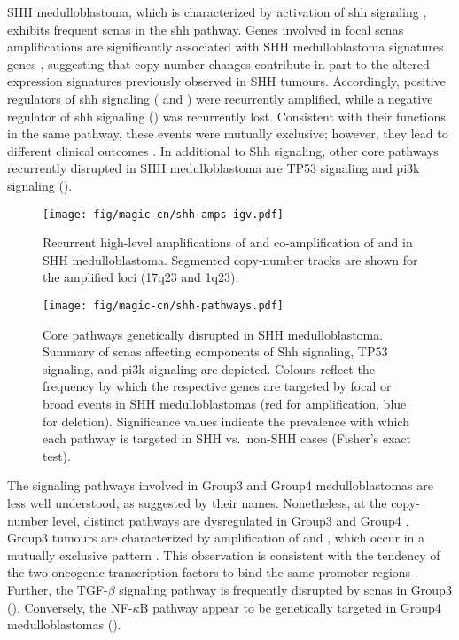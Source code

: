 \clearpage

SHH medulloblastoma, which is characterized by activation of \gls{shh} signaling , exhibits frequent \gls{scnas} in the \gls{shh} pathway. Genes involved in focal \gls{scnas} amplifications are significantly associated with SHH medulloblastoma signatures genes , suggesting that copy-number changes contribute in part to the altered expression signatures previously observed in SHH tumours. Accordingly, positive regulators of \gls{shh} signaling ( and ) were recurrently amplified, while a negative regulator of \gls{shh} signaling () was recurrently lost. Consistent with their functions in the same pathway, these events were mutually exclusive; however, they lead to different clinical outcomes . In additional to Shh signaling, other core pathways recurrently disrupted in SHH medulloblastoma are TP53 signaling and \gls{pi3k} signaling ().

\begin{SCfigure}[5]
	\centering
	\texttt{[image: fig/magic-cn/shh-amps-igv.pdf]}
	\caption[Recurrent amplifications of , , and  in SHH medulloblastoma]
	{
		Recurrent high-level amplifications of  and co-amplification of  and  in SHH medulloblastoma.
		Segmented copy-number tracks are shown for the amplified loci (17q23 and 1q23).
	}
	\label{fig:shh-amps-igv}
\end{SCfigure}

\begin{figure}[5]
	\centering
	\texttt{[image: fig/magic-cn/shh-pathways.pdf]}
	\caption[Core pathways genetically disrupted in SHH medulloblastoma]
	{
	Core pathways genetically disrupted in SHH medulloblastoma.
	Summary of \gls{scnas} affecting components of Shh signaling, TP53 signaling, and \gls{pi3k} signaling are depicted. Colours reflect the frequency by which the respective genes are targeted by focal or broad events in SHH medulloblastomas (red for amplification, blue for deletion). Significance values indicate the prevalence with which each pathway is targeted in SHH vs.\ non-SHH cases (Fisher's exact test).
	}
	\label{fig:shh-pathways}
\end{figure}

\clearpage

The signaling pathways involved in Group3 and Group4 medulloblastomas are less well understood, as suggested by their names. Nonetheless, at the copy-number level, distinct pathways are dysregulated in Group3 and Group4 . Group3 tumours are characterized by amplification of  and , which occur in a mutually exclusive pattern . This observation is consistent with the tendency of the two oncogenic transcription factors to bind the same promoter regions . Further, the TGF-$\beta$ signaling pathway is frequently disrupted by \gls{scnas} in Group3 (). Conversely, the NF-$\kappa$B pathway appear to be genetically targeted in Group4 medulloblastomas ().

